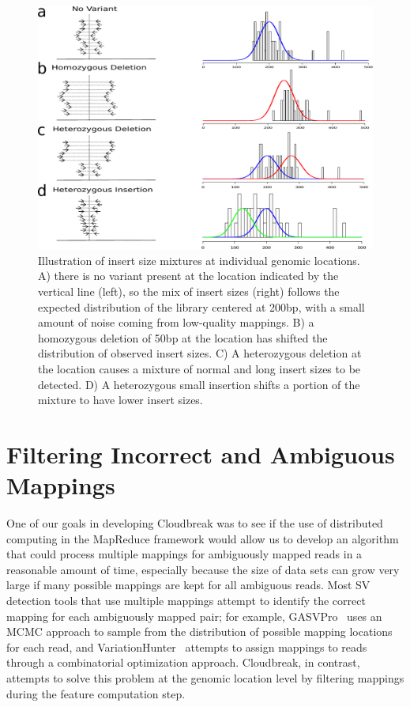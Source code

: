 \begin{figure}
\centering
\includegraphics[width=.9\textwidth]{figures/insert_size_mixtures.pdf}
\caption[Illustration of insert size mixtures at individual genomic locations.]{Illustration of insert size mixtures at individual genomic locations. A) there is no variant present at the location indicated by the vertical line (left), so the mix of insert sizes (right) follows the expected distribution of the library centered at 200bp, with a small amount of noise coming from low-quality mappings. B) a homozygous deletion of 50bp at the location has shifted the distribution of observed insert sizes. C) A heterozygous deletion at the location causes a mixture of normal and long insert sizes to be detected. D) A heterozygous small insertion shifts a portion of the mixture to have lower insert sizes.}
\label{insert_size_mixes}
\end{figure}

\section{Filtering Incorrect and Ambiguous Mappings}\label{section_incorrect_and_ambiguous_mappings}

One of our goals in developing Cloudbreak was to see if the use of distributed computing in the MapReduce framework would allow us to develop an algorithm that could process multiple mappings for ambiguously mapped reads in a reasonable amount of time, especially because the size of data sets can grow very large if many possible mappings are kept for all ambiguous reads. Most SV detection tools that use multiple mappings attempt to identify the correct mapping for each ambiguously mapped pair; for example, GASVPro~\cite{Sindi:2012kk} uses an MCMC approach to sample from the distribution of possible mapping locations for each read, and VariationHunter~\cite{Hormozdiari:2009p284} attempts to assign mappings to reads through a combinatorial optimization approach. Cloudbreak, in contrast, attempts to solve this problem at the genomic location level by filtering mappings during the feature computation step.

